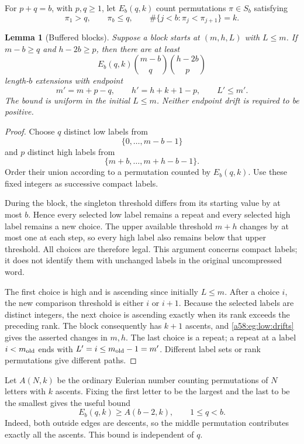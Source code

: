 \documentclass[11pt,letterpaper]{article}
\newtheorem{lemma}[theorem]{Lemma}
\theoremstyle{remark}
\begin{document}
For \(p+q=b\), with \(p,q\ge1\), let \(E_b(q,k)\) count permutations
\(\pi\in S_b\) satisfying
\[
 \pi_1>q,\qquad \pi_b\le q,\qquad
 \#\{j<b:\pi_j<\pi_{j+1}\}=k.
\]

\begin{lemma}[Buffered blocks]\label{a58:eg:low:buffer}
Suppose a block starts at \((m,h,L)\) with \(L\le m\). If
\(m-b\ge q\) and \(h-2b\ge p\), then there are at least
\begin{equation}\label{a58:eg:low:buffer-count}
 E_b(q,k)\binom{m-b}{q}\binom{h-2b}{p}
\end{equation}
length-\(b\) extensions with endpoint
\[
 m'=m+p-q,\qquad h'=h+k+1-p,\qquad L'\le m'.
\]
The bound is uniform in the initial \(L\le m\).
Neither endpoint drift is required to be positive.
\end{lemma}

\begin{proof}
Choose \(q\) distinct low labels from
\[
 \{0,\ldots,m-b-1\}
\]
and \(p\) distinct high labels from
\[
 \{m+b,\ldots,m+h-b-1\}.
\]
Order their union according to a permutation counted by \(E_b(q,k)\).
Use these fixed integers as successive compact labels.

During the block, the singleton threshold differs from its starting value
by at most \(b\). Hence every selected low label remains a repeat and every
selected high label remains a new choice. The upper available threshold
\(m+h\) changes by at most one at each step, so every high label also
remains below that upper threshold. All choices are therefore legal.
This argument concerns compact labels; it does not identify them with
unchanged labels in the original uncompressed word.

The first choice is high and is ascending since initially \(L\le m\).
After a choice \(i\), the new comparison threshold is either \(i\) or
\(i+1\). Because the selected labels are distinct integers, the next
choice is ascending exactly when its rank exceeds the preceding rank.
The block consequently has \(k+1\) ascents, and
\eqref{a58:eg:low:drifts} gives the asserted changes in \(m,h\).
The last choice is a repeat; a repeat at a label \(i<m_{\rm old}\)
ends with \(L'=i\le m_{\rm old}-1=m'\).
Different label sets or rank permutations give different paths.
\end{proof}

Let \(A(N,k)\) be the ordinary Eulerian number counting permutations of
\(N\) letters with \(k\) ascents. Fixing the first letter to be the largest
and the last to be the smallest gives the useful bound
\begin{equation}\label{a58:eg:low:ordinary-eulerian}
 E_b(q,k)\ge A(b-2,k),\qquad 1\le q<b.
\end{equation}
Indeed, both outside edges are descents, so the middle permutation
contributes exactly all the ascents. This bound is independent of \(q\).
\end{document}
